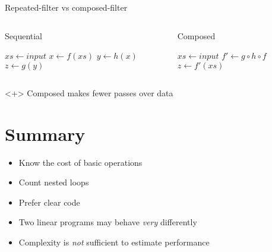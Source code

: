 \documentclass[pdf]{beamer}
\begin{document}
\begin{frame}[fragile]{Repeated-filter vs composed-filter}
    \begin{columns}
        \begin{block}{Sequential}
            \begin{algorithmic}
                \State $xs \gets input$
                \State $x \gets f(xs)$
                \State $y \gets h(x)$
                \State $z \gets g(y)$
            \end{algorithmic}
        \end{block}

        \begin{block}{Composed}
            \begin{algorithmic}
                \State $xs \gets input$
                \State $f' \gets g \circ h \circ f$
                \State $z \gets f'(xs)$
            \end{algorithmic}
        \end{block}
    \end{columns}

    \begin{block}{}<+>
        Composed makes fewer passes over data
    \end{block}
\end{frame}

\section{Summary}
\tableofcontents[currentsection]

\begin{frame}
    \begin{itemize}[<+->]
        \item Know the cost of basic operations
        \item Count nested loops
        \item Prefer clear code
        \item Two linear programs may behave \emph{very} differently
        \item Complexity is \emph{not} sufficient to estimate performance
    \end{itemize}
\end{frame}
\end{document}
